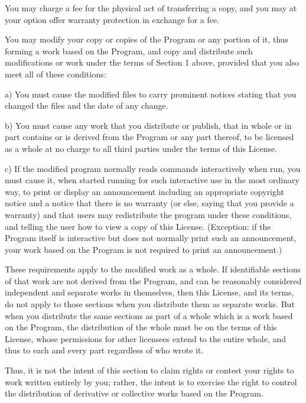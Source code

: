 You may charge a fee for the physical act of transferring a copy, and you may at your option offer warranty protection in exchange for a fee.
\begin{DoxyEnumerate}
\item You may modify your copy or copies of the Program or any portion of it, thus forming a work based on the Program, and copy and distribute such modifications or work under the terms of Section 1 above, provided that you also meet all of these conditions\-: \begin{DoxyVerb}a) You must cause the modified files to carry prominent notices
stating that you changed the files and the date of any change.

b) You must cause any work that you distribute or publish, that in
whole or in part contains or is derived from the Program or any
part thereof, to be licensed as a whole at no charge to all third
parties under the terms of this License.

c) If the modified program normally reads commands interactively
when run, you must cause it, when started running for such
interactive use in the most ordinary way, to print or display an
announcement including an appropriate copyright notice and a
notice that there is no warranty (or else, saying that you provide
a warranty) and that users may redistribute the program under
these conditions, and telling the user how to view a copy of this
License.  (Exception: if the Program itself is interactive but
does not normally print such an announcement, your work based on
the Program is not required to print an announcement.)
\end{DoxyVerb}

\end{DoxyEnumerate}

These requirements apply to the modified work as a whole. If identifiable sections of that work are not derived from the Program, and can be reasonably considered independent and separate works in themselves, then this License, and its terms, do not apply to those sections when you distribute them as separate works. But when you distribute the same sections as part of a whole which is a work based on the Program, the distribution of the whole must be on the terms of this License, whose permissions for other licensees extend to the entire whole, and thus to each and every part regardless of who wrote it.

Thus, it is not the intent of this section to claim rights or contest your rights to work written entirely by you; rather, the intent is to exercise the right to control the distribution of derivative or collective works based on the Program.

